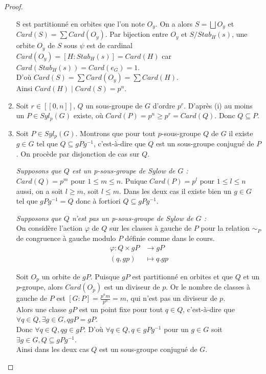 \documentclass{article}
\theoremstyle{definition}
\theoremstyle{plain}
\theoremstyle{plain}
\theoremstyle{plain}
\theoremstyle{plain}
\theoremstyle{plain}
\theoremstyle{definition}
\theoremstyle{plain}
\theoremstyle{plain}
\begin{document}
\begin{proof}
\begin{enumerate}[label={\upshape(\roman*)}]
S est partitionné en orbites que l'on note \( O_y \). On a alors \( S = \bigsqcup O_{y} \) et 
\( Card(S) = \sum Card(O_{y}) \).
Par bijection entre \( O_y \) et \( S/Stab_H(s) \), une orbite \( O_y \) de \( S \) sous \( \psi \) est de cardinal \( Card(O_y) = [H : Stab_{H}({s}) ] = Card(H) \) car \( Card(Stab_{H}({s})) = Card(e_{G}) = 1 \). \\
D'où \( Card(S) = \sum Card(O_{y}) = \sum Card(H) \). \\
Ainsi \( Card(H) \mid Card(S) = p^{n} \).

\item Soit \( r \in [\![0,n]\!] \), \( Q \) un sous-groupe de \( G \) d'ordre \( p^{r} \). 
D'après (i) au moins un \( P \in Syl_p(G) \) existe, où \( Card(P) = p^{n} \geq p ^{r} = Card(Q) \).
Donc \( Q \subseteq P \).

\item Soit \( P \in Syl_{p}({G}) \). Montrons que pour tout \(p\)-sous-groupe \( Q \) de \( G \) il existe \( g \in G \) tel que \( Q \subseteq gPg^{-1} \), c'est-à-dire que \( Q \) est un sous-groupe conjugué de \( P \). On procède par disjonction de cas sur \( Q \).
	\par \textit{Supposons que \( Q \) est un p-sous-groupe de Sylow de \( G \) :}\\
	\( Card(Q) = p^{m}\) pour \( 1 \le m \le n \). Puique \( Card(P) = p^{l}\) pour 
	\( 1 \le l \le n \) aussi, on a soit \( l \ge m \), soit \( l \le m \). Dans les 
	deux cas il existe bien un \( g \in G \) tel que 
	\( gPg^{-1} = Q \) donc à fortiori \( Q \subseteq gPg^{-1} \).
	
	\par \textit{Supposons que \( Q \) n'est pas un p-sous-groupe de Sylow de \( G \) :}\\ On considère l'action \( \varphi \) de \( Q \) sur les classes à gauche de \( P \) pour la relation \( \sim_{P} \) de congruence à gauche modulo \( P \) définie comme dans le cours. 
\begin{align*}
	\varphi : Q \times gP &\to gP \\
	(q,gp) &\mapsto q.gp
\end{align*}

Soit \( O_{p} \) un orbite de \( gP \). Puisque \( gP \) est partitionné en orbites et que \( Q \) et un \(p\)-groupe, alors \( Card(O_{p}) \) est un diviseur de \( p \). Or le nombre de classes à gauche de \( P \) est \([G : P] = \frac{p^{n}m}{p^{n}} = m  \), qui n'est pas un diviseur de \( p \). \\
Alors une classe \( gP \) est un point fixe pour tout \( q \in Q \), c'est-à-dire que \( \forall q \in Q, \exists g \in G, qgP = gP \). \\
Donc \( \forall q \in Q, qg \in gP \). D'où \( \forall q \in Q, q \in gPg^{-1} \) pour un \( g \in G \) soit \(\exists g \in G, Q \subseteq gPg^{-1} \).\\ 
Ainsi dans les deux cas \( Q \) est un sous-groupe conjugué de \( G \).


\end{enumerate}
\end{proof}
\end{document}
